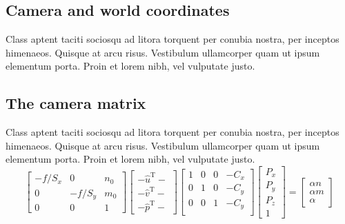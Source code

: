 \subsection{Camera and world coordinates}
Class aptent taciti sociosqu ad litora torquent per conubia nostra, per inceptos himenaeos. Quisque at arcu risus. Vestibulum ullamcorper quam ut ipsum elementum porta. Proin et lorem nibh, vel vulputate justo.
\subsection{The camera matrix}
Class aptent taciti sociosqu ad litora torquent per conubia nostra, per inceptos himenaeos. Quisque at arcu risus. Vestibulum ullamcorper quam ut ipsum elementum porta. Proin et lorem nibh, vel vulputate justo.
\[
\begin{bmatrix}
   -f/S_x		 	& 0 		& n_0 	\\
   0 				& -f/S_y    & m_0	\\
   0           		& 0 		& 1
\end{bmatrix}
\begin{bmatrix}
	- \hat{u}^\mathrm{T} -	\\
	- \hat{v}^\mathrm{T} -	\\
	- \hat{p}^\mathrm{T} -
\end{bmatrix}
\begin{bmatrix}
	1 & 0 & 0 & -C_x	\\
	0 & 1 & 0 & -C_y	\\
	0 & 0 & 1 & -C_y	\\
\end{bmatrix}
\begin{bmatrix}
	P_x \\
	P_y \\
	P_z	\\
	1
\end{bmatrix}
=
\begin{bmatrix}
	\alpha n	\\
	\alpha m	\\
	\alpha
\end{bmatrix}
\]

